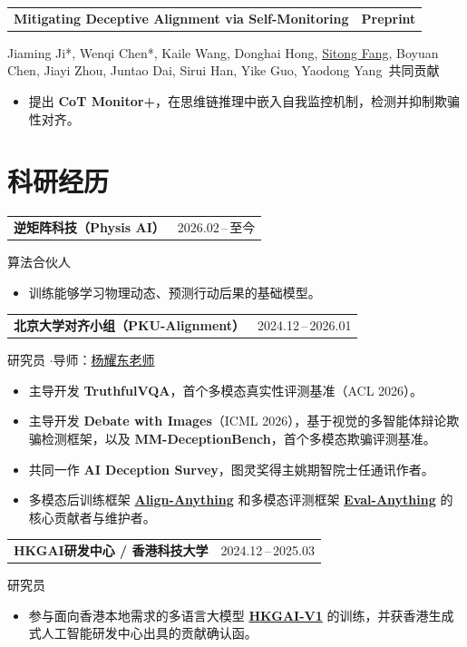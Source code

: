 \documentclass[11pt,a4paper]{article}
\makeatletter
\newcommand{\me}{\uline{Sitong Fang}}
\newcommand{\pubentry}[3]{%
  \Needspace{5\baselineskip}%
  \noindent\begin{tabularx}{\textwidth}{@{}>{\raggedright\arraybackslash}X r@{}}
    \textbf{#1} & #2\enspace\href{#3}{\faFilePdf} \\
  \end{tabularx}\vspace{-2pt}%
}
\newcommand{\cventry}[2]{%
  \Needspace{4\baselineskip}%
  \noindent\begin{tabularx}{\textwidth}{@{}X r@{}}
    \textbf{#1} & {#2} \\
  \end{tabularx}\vspace{-2pt}%
}
\newcommand{\venue}[1]{%
  \colorbox{gray!15}{\small\textbf{#1}}%
}
\makeatother
\begin{document}
\vspace{0.3em}

\pubentry{Mitigating Deceptive Alignment via Self-Monitoring}{\venue{Preprint}}{https://arxiv.org/abs/2505.18807}
Jiaming Ji*, Wenqi Chen*, Kaile Wang, Donghai Hong, \me{}, Boyuan Chen, Jiayi Zhou, Juntao Dai, Sirui Han, Yike Guo, Yaodong Yang
\hfill {\small *\,共同贡献}
\begin{itemize}
  \item 提出 \textbf{CoT Monitor+}，在思维链推理中嵌入自我监控机制，检测并抑制欺骗性对齐。
\end{itemize}

\section{科研经历}

\cventry{逆矩阵科技（Physis AI）}{2026.02\,--\,至今}
\noindent 算法合伙人
\begin{itemize}
  \item 训练能够学习物理动态、预测行动后果的基础模型。
\end{itemize}

\vspace{0.3em}

\cventry{北京大学对齐小组（PKU-Alignment）}{2024.12\,--\,2026.01}
\noindent 研究员 \enspace$\cdot$\enspace 导师：\href{https://www.yangyaodong.com/}{杨耀东老师}
\begin{itemize}
  \item 主导开发 \textbf{TruthfulVQA}，首个多模态真实性评测基准（ACL 2026）。
  \item 主导开发 \textbf{Debate with Images}（ICML 2026），基于视觉的多智能体辩论欺骗检测框架，以及 \textbf{MM-DeceptionBench}，首个多模态欺骗评测基准。
  \item 共同一作 \textbf{AI Deception Survey}，图灵奖得主姚期智院士任通讯作者。
  \item 多模态后训练框架 \href{https://github.com/PKU-Alignment/align-anything}{\textbf{Align-Anything}} 和多模态评测框架 \href{https://github.com/PKU-Alignment/eval-anything}{\textbf{Eval-Anything}} 的核心贡献者与维护者。
\end{itemize}

\vspace{0.3em}

\cventry{HKGAI研发中心 / 香港科技大学}{2024.12\,--\,2025.03}
\noindent 研究员
\begin{itemize}
  \item 参与面向香港本地需求的多语言大模型 \href{https://arxiv.org/abs/2507.11502}{\textbf{HKGAI-V1}} 的训练，并获香港生成式人工智能研发中心出具的贡献确认函。
\end{itemize}
\end{document}
